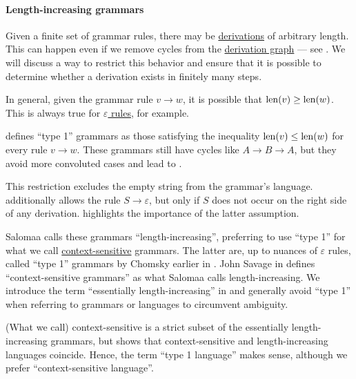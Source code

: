 \paragraph{Length-increasing grammars}

\begin{remark}\label{rem:length_increasing_grammar}
  Given a finite set of grammar rules, there may be \hyperref[def:formal_grammar/derivation]{derivations} of arbitrary length. This can happen even if we remove cycles from the \hyperref[def:formal_grammar/graph]{derivation graph} --- see . We will discuss a way to restrict this behavior and ensure that it is possible to determine whether a derivation exists in finitely many steps.

  In general, given the grammar rule \( v \to w \), it is possible that \( \operatorname{len}(v) \geq \operatorname{len}(w) \). This is always true for \hyperref[def:epsilon_free_grammar]{\( \varepsilon \) rules}, for example.

   defines \enquote{type 1} grammars as those satisfying the inequality \( \operatorname{len}(v) \leq \operatorname{len}(w) \) for every rule \( v \to w \). These grammars still have cycles like \( A \to B \to A \), but they avoid more convoluted cases and lead to .

  This restriction excludes the empty string from the grammar's language.  additionally allows the rule \( S \to \varepsilon \), but only if \( S \) does not occur on the right side of any derivation.  highlights the importance of the latter assumption.

  Salomaa calls these grammars \enquote{length-increasing}, preferring to use \enquote{type 1} for what we call \hyperref[def:chomsky_hierarchy/context_sensitive]{context-sensitive} grammars. The latter are, up to nuances of \( \varepsilon \) rules, called \enquote{type 1} grammars by Chomsky earlier in \cite[142]{Chomsky1959Grammars}. John Savage in \cite[def. 4.9.2]{Savage2008Computability} defines \enquote{context-sensitive grammars} as what Salomaa calls length-increasing. We introduce the term \enquote{essentially length-increasing} in  and generally avoid \enquote{type 1} when referring to grammars or languages to circumvent ambiguity.

  (What we call) context-sensitive  is a strict subset of the essentially length-increasing grammars, but  shows that context-sensitive  and length-increasing languages coincide. Hence, the term \enquote{type 1 language} makes sense, although we prefer \enquote{context-sensitive language}.
\end{remark}

